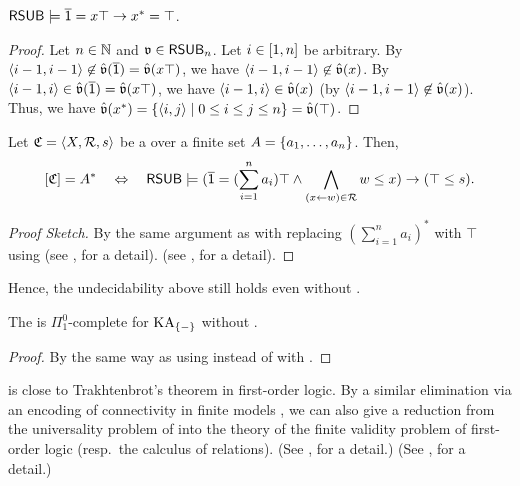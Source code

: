\begin{proposition}\label{proposition: star to top}
    $\mathsf{RSUB} \models \overline{\mathsf{1}} = x \top \to x^* = \top$.
\end{proposition}
\begin{proof}
    Let $n \in \mathbb{N}$ and $\mathfrak{v} \in \mathsf{RSUB}_{n}$.
    Let $i \in [1, n]$ be arbitrary.
    By $\langle i-1, i-1\rangle \not\in \hat{\mathfrak{v}}(\overline{\mathsf{1}}) = \hat{\mathfrak{v}}(x \top)$, we have $\langle i-1, i-1\rangle \not\in \hat{\mathfrak{v}}(x)$.
    By $\langle i-1, i\rangle \in \hat{\mathfrak{v}}(\overline{\mathsf{1}}) = \hat{\mathfrak{v}}(x \top)$, we have $\langle i-1, i\rangle \in \hat{\mathfrak{v}}(x)$ (by $\langle i-1, i-1\rangle \not\in \hat{\mathfrak{v}}(x)$).
    Thus, we have $\hat{\mathfrak{v}}(x^*) = \{\langle i, j\rangle \mid 0 \le i \le j \le n\} = \hat{\mathfrak{v}}(\top)$.
\end{proof}
\begin{lemma}\label{lemma: CFG and LANG star-free}
    Let $\mathfrak{C} = \langle X, \mathcal{R}, s\rangle$ be a  over a finite set $A = \{a_1, \dots, a_n\}$.
    Then,
    \[[ \mathfrak{C} ] = A^* \quad\Leftrightarrow\quad \mathsf{RSUB} \models  (\overline{\mathsf{1}} = (\sum_{i = 1}^{n} a_i) \top \land \bigwedge_{(x \leftarrow w) \in \mathcal{R}} w \le x) \to (\top \le s).\]
\end{lemma}
\begin{proof}[Proof Sketch]
    By the same argument as  with replacing $(\sum_{i = 1}^{n} a_i)^*$ with $\top$ using 
    \ifiscameraready
    (see \cite{nakamuraFiniteRelationalSemantics2024}, for a detail).
    \else
    (see , for a detail).
    \fi
\end{proof}
Hence, the undecidability above still holds even without .
\begin{theorem}\label{theorem: Pi01-complete star-free restated}
    The  is $\Pi^{0}_{1}$-complete for $\mathrm{KA}_{\{-\}}$ without .
\end{theorem}
\begin{proof}
    By the same way as  using  instead of with .
\end{proof}

\begin{remark}\label{remark: Trakhtenbrot}
     is close to Trakhtenbrot's theorem \cite{trakhtenbrotImpossibilityAlgorithmDecision1950} in first-order logic.
    By a similar  elimination via an encoding of connectivity in finite models \cite[p.\ 30]{ebbinghausFiniteModelTheory1995},
    we can also give a reduction from the universality problem of  into the theory of the finite validity problem of first-order logic (resp.\ the calculus of relations).
    \ifiscameraready
    (See \cite{nakamuraFiniteRelationalSemantics2024}, for a detail.)
    \else
    (See , for a detail.)
    \fi
    \lipicsEnd
\end{remark}
